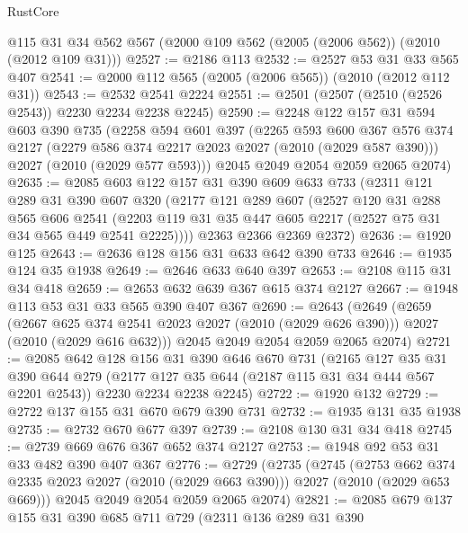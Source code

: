 \begin{lexlean}{RustCore}
\begin{coremodule}
    @115
    @31
    @34
    @562
    @567
    (@2000 @109 @562 (@2005 (@2006 @562)) (@2010 (@2012 @109 @31)))
@2527 := @2186 @113
@2532 := @2527 @53 @31 @33 @565 @407
@2541 := @2000 @112 @565 (@2005 (@2006 @565)) (@2010 (@2012 @112 @31))
@2543 := @2532 @2541 @2224
@2551 := @2501 (@2507 (@2510 (@2526 @2543)) @2230 @2234 @2238 @2245)
@2590 := @2248
    @122
    @157
    @31
    @594
    @603
    @390
    @735
    (@2258
      @594
      @601
      @397
      (@2265
        @593
        @600
        @367
        @576
        @374
        @2127
        (@2279 @586 @374 @2217 @2023 @2027 (@2010 (@2029 @587 @390)))
        @2027
        (@2010 (@2029 @577 @593)))
      @2045
      @2049
      @2054
      @2059
      @2065
      @2074)
@2635 := @2085
    @603
    @122
    @157
    @31
    @390
    @609
    @633
    @733
    (@2311
      @121
      @289
      @31
      @390
      @607
      @320
      (@2177
        @121
        @289
        @607
        (@2527
          @120
          @31
          @288
          @565
          @606
          @2541
          (@2203 @119 @31 @35 @447 @605 @2217 (@2527 @75 @31 @34 @565 @449 @2541 @2225))))
      @2363
      @2366
      @2369
      @2372)
@2636 := @1920 @125
@2643 := @2636 @128 @156 @31 @633 @642 @390 @733
@2646 := @1935 @124 @35 @1938
@2649 := @2646 @633 @640 @397
@2653 := @2108 @115 @31 @34 @418
@2659 := @2653 @632 @639 @367 @615 @374 @2127
@2667 := @1948 @113 @53 @31 @33 @565 @390 @407 @367
@2690 := @2643
    (@2649
      (@2659
        (@2667 @625 @374 @2541 @2023 @2027 (@2010 (@2029 @626 @390)))
        @2027
        (@2010 (@2029 @616 @632)))
      @2045
      @2049
      @2054
      @2059
      @2065
      @2074)
@2721 := @2085
    @642
    @128
    @156
    @31
    @390
    @646
    @670
    @731
    (@2165
      @127
      @35
      @31
      @390
      @644
      @279
      (@2177 @127 @35 @644 (@2187 @115 @31 @34 @444 @567 @2201 @2543))
      @2230
      @2234
      @2238
      @2245)
@2722 := @1920 @132
@2729 := @2722 @137 @155 @31 @670 @679 @390 @731
@2732 := @1935 @131 @35 @1938
@2735 := @2732 @670 @677 @397
@2739 := @2108 @130 @31 @34 @418
@2745 := @2739 @669 @676 @367 @652 @374 @2127
@2753 := @1948 @92 @53 @31 @33 @482 @390 @407 @367
@2776 := @2729
    (@2735
      (@2745
        (@2753 @662 @374 @2335 @2023 @2027 (@2010 (@2029 @663 @390)))
        @2027
        (@2010 (@2029 @653 @669)))
      @2045
      @2049
      @2054
      @2059
      @2065
      @2074)
@2821 := @2085
    @679
    @137
    @155
    @31
    @390
    @685
    @711
    @729
    (@2311
      @136
      @289
      @31
      @390

\end{coremodule}
\end{lexlean}
